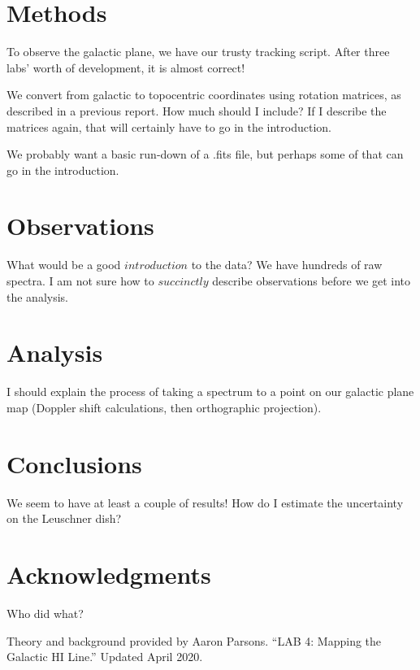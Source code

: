 \documentclass[12pt]{article}
\begin{document}
\section{Methods}

\quad \quad To observe the galactic plane, we have our trusty tracking script. After three labs' worth of development, it is almost correct!

We convert from galactic to topocentric coordinates using rotation matrices, as described in a previous report. How much should I include? If I describe the matrices again, that will certainly have to go in the introduction.

We probably want a basic run-down of a .fits file, but perhaps some of that can go in the introduction.

\section{Observations}

\quad \quad What would be a good $introduction$ to the data? We have hundreds of raw spectra. I am not sure how to $succinctly$ describe observations before we get into the analysis.

\section{Analysis}

\quad \quad I should explain the process of taking a spectrum to a point on our galactic plane map (Doppler shift calculations, then orthographic projection). 

\section{Conclusions}

\quad \quad We seem to have at least a couple of results! How do I estimate the uncertainty on the Leuschner dish?

\section{Acknowledgments}

\quad \quad Who did what?

Theory and background provided by Aaron Parsons. ``LAB 4: Mapping the Galactic HI Line.'' Updated April 2020.

\end{document}
